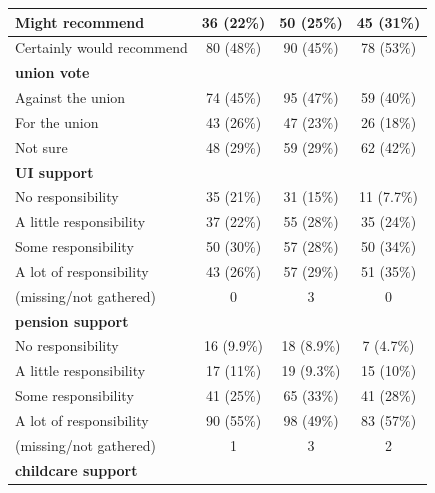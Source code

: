 \documentclass[
  11pt,
  oneside]{article}
\begin{document}
\begin{table}
\begin{tabular}[t]{l|c|c|c}
\hline
\hspace{1em}Might recommend & 36 (22\%) & 50 (25\%) & 45 (31\%)\\
\hline
\hspace{1em}Certainly would recommend & 80 (48\%) & 90 (45\%) & 78 (53\%)\\
\hline
\textbf{union vote} &  &  & \\
\hline
\hspace{1em}Against the union & 74 (45\%) & 95 (47\%) & 59 (40\%)\\
\hline
\hspace{1em}For the union & 43 (26\%) & 47 (23\%) & 26 (18\%)\\
\hline
\hspace{1em}Not sure & 48 (29\%) & 59 (29\%) & 62 (42\%)\\
\hline
\textbf{UI support} &  &  & \\
\hline
\hspace{1em}No responsibility & 35 (21\%) & 31 (15\%) & 11 (7.7\%)\\
\hline
\hspace{1em}A little responsibility & 37 (22\%) & 55 (28\%) & 35 (24\%)\\
\hline
\hspace{1em}Some responsibility & 50 (30\%) & 57 (28\%) & 50 (34\%)\\
\hline
\hspace{1em}A lot of responsibility & 43 (26\%) & 57 (29\%) & 51 (35\%)\\
\hline
\hspace{1em}(missing/not gathered) & 0 & 3 & 0\\
\hline
\textbf{pension support} &  &  & \\
\hline
\hspace{1em}No responsibility & 16 (9.9\%) & 18 (8.9\%) & 7 (4.7\%)\\
\hline
\hspace{1em}A little responsibility & 17 (11\%) & 19 (9.3\%) & 15 (10\%)\\
\hline
\hspace{1em}Some responsibility & 41 (25\%) & 65 (33\%) & 41 (28\%)\\
\hline
\hspace{1em}A lot of responsibility & 90 (55\%) & 98 (49\%) & 83 (57\%)\\
\hline
\hspace{1em}(missing/not gathered) & 1 & 3 & 2\\
\hline
\textbf{childcare support} &  &  & \\

\end{tabular}
\end{table}
\end{document}
